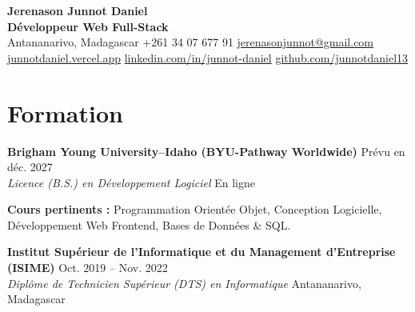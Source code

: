\documentclass[10pt,a4paper]{article}
\newcommand{\entry}[4]{%
  {\bfseries #1} \hfill {\color{muted}#2}\\
  {\color{accent}\itshape #3} \hfill {\color{muted}\small #4}\par
  \vspace{1pt}}
\newcommand{\sep}{\hspace{4pt}{\color{muted}|}\hspace{4pt}}
\begin{document}
\vspace*{-6pt}
\begin{center}
  {\fontsize{22}{26}\selectfont\bfseries\color{accent}
    Jerenason Junnot Daniel}\\[3pt]
  {\large\bfseries\color{muted} Développeur Web Full-Stack}\\[4pt]
  {\small
    Antananarivo, Madagascar\sep
    +261 34 07 677 91\sep
    \href{mailto:jerenasonjunnot@gmail.com}{jerenasonjunnot@gmail.com}\\[2pt]
    \href{https://junnotdaniel.vercel.app}{junnotdaniel.vercel.app}\sep
    \href{https://www.linkedin.com/in/junnot-daniel}{linkedin.com/in/junnot-daniel}\sep
    \href{https://github.com/junnotdaniel13}{github.com/junnotdaniel13}}
\end{center}
\vspace{-6pt}

\vfill


\section*{Formation}
\entry{Brigham Young University--Idaho (BYU-Pathway Worldwide)}{Prévu en déc. 2027}%
{Licence (B.S.) en Développement Logiciel}{En ligne}
{\small\color{muted}\textbf{Cours pertinents :} Programmation Orientée Objet,
Conception Logicielle, Développement Web Frontend, Bases de Données \& SQL.}\par
\vspace{5pt}

\entry{Institut Supérieur de l'Informatique et du Management d'Entreprise (ISIME)}%
{Oct. 2019 -- Nov. 2022}{Diplôme de Technicien Supérieur (DTS) en Informatique}{Antananarivo, Madagascar}
\end{document}
